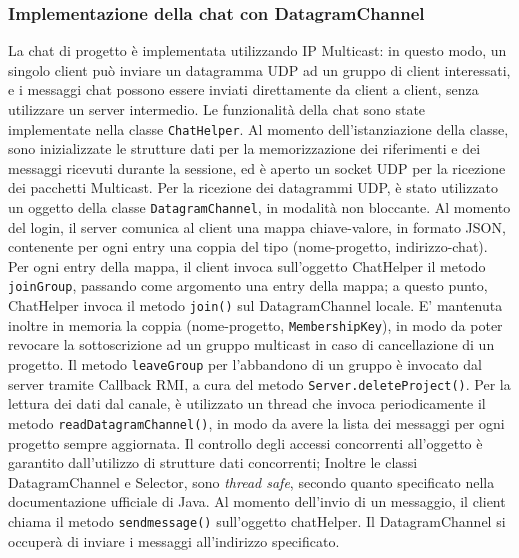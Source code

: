 \documentclass{article}
\begin{document}
\subsubsection{Implementazione della chat con DatagramChannel}
La chat di progetto è implementata utilizzando IP Multicast: in questo modo, un singolo client può inviare un datagramma UDP ad un gruppo di client interessati, e i messaggi chat possono essere inviati direttamente da client a client, senza utilizzare un server intermedio.
Le funzionalità della chat sono state implementate nella classe \texttt{ChatHelper}. Al momento dell'istanziazione della classe, sono inizializzate le strutture dati per la memorizzazione dei riferimenti e dei messaggi ricevuti durante la sessione, ed è aperto un socket UDP per la ricezione dei pacchetti Multicast. 
Per la ricezione dei datagrammi UDP, è stato utilizzato un oggetto della classe \texttt{DatagramChannel}, in modalità non bloccante. Al momento del login, il server comunica al client una mappa chiave-valore, in formato JSON, contenente per ogni entry una coppia del tipo (nome-progetto, indirizzo-chat). Per ogni entry della mappa, il client invoca sull'oggetto ChatHelper il metodo \texttt{joinGroup}, passando come argomento una entry della mappa; a questo punto, ChatHelper invoca il metodo \texttt{join()} sul DatagramChannel locale. E' mantenuta inoltre in memoria la coppia (nome-progetto, \texttt{MembershipKey}), in modo da poter revocare la sottoscrizione ad un gruppo multicast in caso di cancellazione di un progetto. Il metodo \texttt{leaveGroup} per l'abbandono di un gruppo è invocato dal server tramite Callback RMI, a cura del metodo \texttt{Server.deleteProject()}.
Per la lettura dei dati dal canale, è utilizzato un thread che invoca periodicamente il metodo \texttt{readDatagramChannel()}, in modo da avere la lista dei messaggi per ogni progetto sempre aggiornata. Il controllo degli accessi concorrenti all'oggetto è garantito dall'utilizzo di strutture dati concorrenti; Inoltre le classi DatagramChannel e Selector, sono \emph{thread safe}, secondo quanto specificato nella documentazione ufficiale di Java.
Al momento dell'invio di un messaggio, il client chiama il metodo \texttt{sendmessage()} sull'oggetto chatHelper. Il DatagramChannel si occuperà di inviare i messaggi all'indirizzo specificato.
\end{document}
